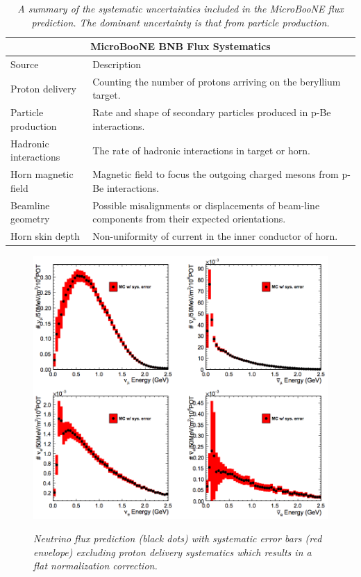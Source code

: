 \begin{table}
\begin{tabular}{ |p{4cm}|p{10cm}|  }
 \hline
 \multicolumn{2}{|c|}{MicroBooNE BNB Flux Systematics} \\
 \hline
 Source & Description \\
 \hline \hline
 Proton delivery & Counting the number of protons arriving on the beryllium target. \\\hline
 Particle production & Rate and shape of secondary particles produced in p-Be interactions. \\\hline
 Hadronic interactions & The rate of hadronic interactions in target or horn. \\\hline
 Horn magnetic field & Magnetic field to focus the outgoing charged mesons from p-Be interactions. \\\hline
 Beamline geometry & Possible misalignments or displacements of beam-line components from their expected orientations. \\\hline
 Horn skin depth & Non-uniformity of current in the inner conductor of horn. \\\hline 
 \hline
\end{tabular}
\caption{\textit{A summary of the systematic uncertainties included in the MicroBooNE flux prediction. The dominant uncertainty is that from particle production.}}\label{flux_sys_uncerts}
\end{table}


\begin{figure}[ht!]
\centering
	\includegraphics[width=1.0\textwidth]{Figures/UB_flux_fig.png} \\
\caption{\textit{Neutrino flux prediction (black dots) with systematic error bars (red envelope) excluding proton delivery systematics which results in a flat normalization correction.}}\label{UB_flux_fig}
\end{figure}

